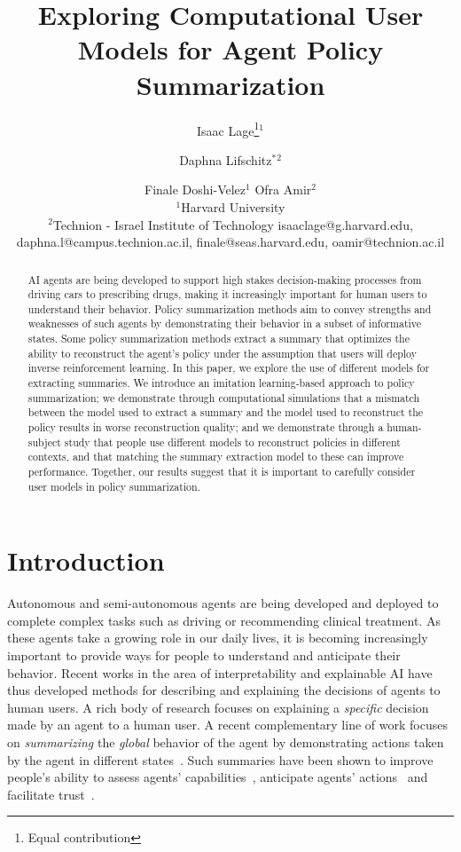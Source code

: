 \documentclass{article}
\title{Exploring Computational User Models for Agent Policy Summarization}
\author{
Isaac Lage\footnote{Equal contribution}$^1$\and
Daphna Lifschitz$^*$$^2$\and
Finale Doshi-Velez$^1$\And
Ofra Amir$^2$\\
\affiliations
$^1$Harvard University\\
$^2$Technion - Israel Institute of Technology
\emails
isaaclage@g.harvard.edu,
daphna.l@campus.technion.ac.il,
finale@seas.harvard.edu,
oamir@technion.ac.il
}
\begin{document}
\maketitle

\begin{abstract}
AI agents are being developed to support high stakes decision-making processes from driving cars to prescribing drugs, making it increasingly important for human users to understand their behavior. Policy summarization methods aim to convey strengths and weaknesses of such agents by demonstrating their behavior in a subset of informative states. Some policy summarization methods extract a summary that optimizes the ability to reconstruct the agent's policy under the assumption that users will deploy inverse reinforcement learning. In this paper, we explore the use of different models for extracting summaries. We introduce an imitation learning-based approach to policy summarization; we demonstrate through computational simulations that a mismatch between the model used to extract a summary and the model used to reconstruct the policy results in worse reconstruction quality; and we demonstrate through a human-subject study that people use different models to reconstruct policies in different contexts, and that matching the summary extraction model to these can improve performance. Together, our results suggest that it is important to carefully consider user models in policy summarization.
\end{abstract}

\maketitle

\section{Introduction}
Autonomous and semi-autonomous agents are being developed and deployed to complete complex tasks such as driving or recommending clinical treatment. As these agents take a growing role in our daily lives, it is becoming increasingly important to provide ways for people to understand and anticipate their behavior. Recent works in the area of interpretability and explainable AI have thus developed methods for describing and explaining the decisions of agents to human users. A rich body of research focuses on explaining a \emph{specific} decision made by an agent to a human user. A recent complementary line of work focuses on \emph{summarizing} the \emph{global} behavior of the agent by demonstrating actions taken by the agent in different states~\cite{amir2018agent}. Such summaries have been shown to improve people's ability to assess agents' capabilities~\cite{amir2018highlights,huang2018establishing}, anticipate agents' actions~\cite{huang17communicate} and facilitate trust~\cite{huang2018establishing}. 
\end{document}
